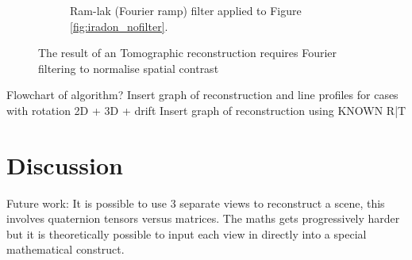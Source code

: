 \begin{figure}
\begin{subfigure}[t]{0.3\textwidth}
    \caption{Ram-lak (Fourier ramp) filter applied to Figure \ref{fig:iradon_nofilter}.}
    \label{fig:iradon_filter}
  \end{subfigure}
    \hfill
    \label{fig:irandons}
  \caption{The result of an Tomographic reconstruction requires Fourier filtering to normalise spatial contrast}
\end{figure}

Flowchart of algorithm?
Insert graph of reconstruction and line profiles for cases with rotation 2D + 3D + drift
Insert graph of reconstruction using KNOWN R|T


\section{Discussion}

Future work:
It is possible to use 3 separate views to reconstruct a scene, this involves quaternion tensors versus matrices.
The maths gets progressively harder but it is theoretically possible to input each view in directly into a special mathematical construct.
